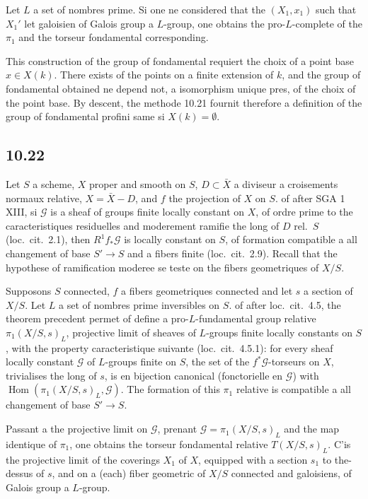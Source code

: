 \documentclass[12pt,a4paper]{article}
\theoremstyle{plain}
\theoremstyle{definition}
\theoremstyle{remark}
\DeclareMathOperator{\Hom}{Hom}
\begin{document}
Let $L$ a set of nombres prime. Si one ne considered that the $(X_1, x_1)$ such that $X_1'$ let galoisien of Galois group a $L$-group, one obtains the pro-$L$-complete of the $\pi_1$ and the torseur fondamental corresponding.

This construction of the group of fondamental requiert the choix of a point base $x \in X(k)$. There exists of the points on a finite extension of $k$, and the group of fondamental obtained ne depend not, a isomorphism unique pres, of the choix of the point base. By descent, the methode 10.21 fournit therefore a definition of the group of fondamental profini same si $X(k) = \emptyset$.


\subsection*{10.22}

Let $S$ a scheme, $X$ proper and smooth on $S$, $D \subset \bar{X}$ a diviseur a croisements normaux relative, $X = \bar{X} - D$, and $f$ the projection of $X$ on $S$. of after SGA 1 XIII, si $\mathcal{G}$ is a sheaf of groups finite locally constant on $X$, of ordre prime to the caracteristiques residuelles and moderement ramifie the long of $D$ rel.~$S$ (loc.~cit.~2.1), then $R^1 f_* \mathcal{G}$ is locally constant on $S$, of formation compatible a all changement of base $S' \to S$ and a fibers finite (loc.~cit.~2.9). Recall that the hypothese of ramification moderee se teste on the fibers geometriques of $X/S$.

Supposons $S$ connected, $f$ a fibers geometriques connected and let $s$ a section of $X/S$. Let $L$ a set of nombres prime inversibles on $S$. of after loc.~cit.~4.5, the theorem precedent permet of define a pro-$L$-fundamental group relative $\pi_1(X/S, s)_L$, projective limit of sheaves of $L$-groups finite locally constants on $S$, with the property caracteristique suivante (loc.~cit.~4.5.1): for every sheaf locally constant $\mathcal{G}$ of $L$-groups finite on $S$, the set of the $f^*\mathcal{G}$-torseurs on $X$, trivialises the long of $s$, is en bijection canonical (fonctorielle en $\mathcal{G}$) with $\Hom(\pi_1(X/S, s)_L, \mathcal{G})$. The formation of this $\pi_1$ relative is compatible a all changement of base $S' \to S$.

Passant a the projective limit on $\mathcal{G}$, prenant $\mathcal{G} = \pi_1(X/S, s)_L$ and the map identique of $\pi_1$, one obtains the torseur fondamental relative $T(X/S, s)_L$. C'is the projective limit of the coverings $X_1$ of $X$, equipped with a section $s_1$ to the-dessus of $s$, and on a (each) fiber geometric of $X/S$ connected and galoisiens, of Galois group a $L$-group.
\end{document}
